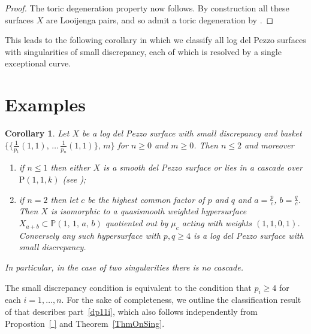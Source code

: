 \documentclass[12pt,a4paper]{book}      %
\newtheorem{cor}[thm]{Corollary}
\newcommand{\mb}[1]{\mathbb{#1}}
\newcommand{\LJ}{Looijenga pair}
\renewcommand{\P}{\mathrm{P}}
\begin{document}
\begin{proof}
The toric degeneration property now follows. By construction all these surfaces $X$ are \LJ s,
and so admit a toric degeneration by \cite[Theorem ??]{GHK}.
\end{proof}


This leads to the following corollary in which we classify all log del Pezzo surfaces with singularities of small discrepancy, each of which is resolved by a single exceptional curve.
 
\section{Examples}
 
\begin{cor}
Let $X$ be a log del Pezzo surface with small discrepancy and
basket  $\{ \{ \frac{1}{p_1}(1,1), \, \dots \, \frac{1}{p_n}(1,1) \}, \, m \}$
for $n\ge0$ and $m\ge0$. Then $n\le2$ and moreover
\begin{enumerate}
\item\label{dp11i}
if $n\le1$ then either $X$ is a smooth del Pezzo surface or 
lies in a cascade over $\P(1,1,k)$ (see \cite[Table ??]{CP});
\item\label{dp11ii}
if $n=2$ then let $c$ be the highest common factor of $p$ and $q$ and $a = \frac{p}{c}$, $b = \frac{q}{c}$. Then $X$
is isomorphic to a quasismooth weighted hypersurface
$X_{a+b}\subset \mb{P}(1,\,1,\,a,\,b)$ quotiented out by $\mu_c$ acting with weights $(1,1,0,1)$. Conversely any such hypersurface with $p,q\ge4$ is
a log del Pezzo surface with small discrepancy.
\end{enumerate}
In particular, in the case of two singularities there is no cascade.
\end{cor}

The small discrepancy condition is equivalent to the condition that
$p_i \geq 4$ for each $i=1,\dots,n$. 
For the sake of completeness, we outline the classification result of \cite{CP} that
describes part~\ref{dp11i}, which also follows independently from Propostion~\ref{ } and Theorem~\ref{ThmOnSing}.
\end{document}
